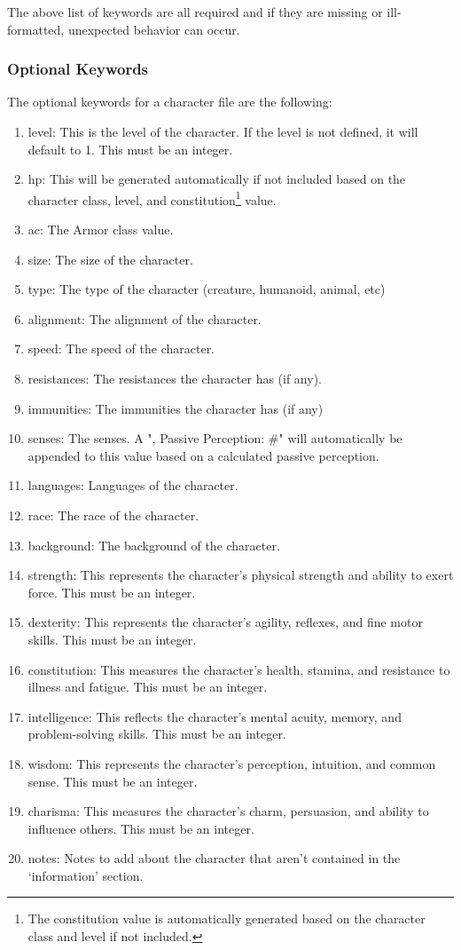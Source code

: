 The above list of keywords are all required and if they are missing or ill-formatted, unexpected behavior can occur.






\subsubsection{Optional Keywords}

The optional keywords for a character file are the following:
\begin{enumerate}
	\item level: This is the level of the character. If the level is not defined, it will default to 1. This must be an integer.
	\item hp: This will be generated automatically if not included based on the character class, level, and constitution\footnote{The constitution value is automatically generated based on the character class and level if not included.} value.
	\item ac: The Armor class value.
	\item size: The size of the character.
	\item type: The type of the character (creature, humanoid, animal, etc)
	\item alignment: The alignment of the character.
	\item speed: The speed of the character.
	\item resistances: The resistances the character has (if any).
	\item immunities: The immunities the character has (if any)
	\item senses: The senses. A ", Passive Perception: \#" will automatically be appended to this value based on a calculated passive perception.
	\item languages: Languages of the character.
	\item race: The race of the character.
	\item background: The background of the character.
	\item strength: This represents the character's physical strength and ability to exert force. This must be an integer.
	\item dexterity: This represents the character's agility, reflexes, and fine motor skills. This must be an integer.
	\item constitution: This measures the character's health, stamina, and resistance to illness and fatigue. This must be an integer.
	\item intelligence: This reflects the character's mental acuity, memory, and problem-solving skills. This must be an integer.
	\item wisdom: This represents the character's perception, intuition, and common sense. This must be an integer.
	\item charisma: This measures the character's charm, persuasion, and ability to influence others. This must be an integer.
	\item notes: Notes to add about the character that aren't contained in the `information' section.
\end{enumerate}

